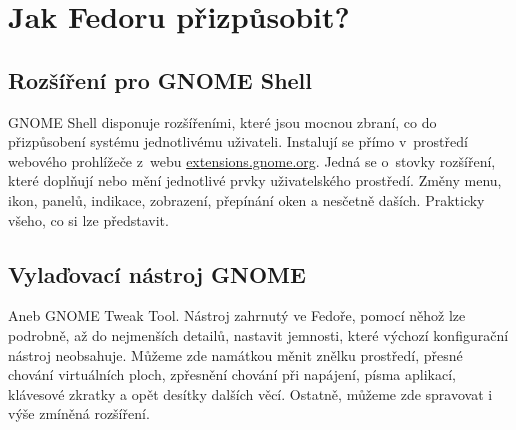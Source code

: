\chapter*{Jak Fedoru přizpůsobit?}
\section*{Rozšíření pro GNOME Shell}
GNOME Shell disponuje rozšířeními, které jsou mocnou zbraní, co do přizpůsobení systému jednotlivému uživateli. Instalují se přímo v~prostředí webového prohlížeče z~webu \url{extensions.gnome.org}. Jedná se o~stovky rozšíření, které doplňují nebo mění jednotlivé prvky uživatelského prostředí. Změny menu, ikon, panelů, indikace, zobrazení, přepínání oken a nesčetně daších. Prakticky všeho, co si lze představit.

\section*{Vylaďovací nástroj GNOME}
Aneb GNOME Tweak Tool. Nástroj zahrnutý ve Fedoře, pomocí něhož lze podrobně, až do nejmenších detailů, nastavit jemnosti, které výchozí konfigurační nástroj neobsahuje. Můžeme zde namátkou měnit znělku prostředí, přesné chování virtuálních ploch, zpřesnění chování při napájení, písma aplikací, klávesové zkratky a opět desítky dalších věcí. Ostatně, můžeme zde spravovat i výše zmíněná rozšíření.
